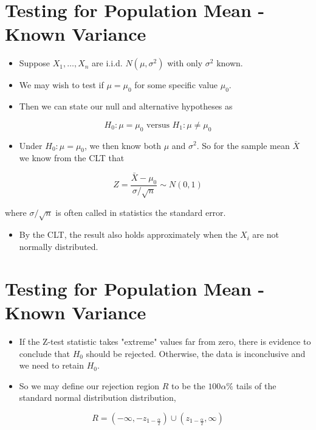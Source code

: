 \documentclass[10pt]{article}
\begin{document}
\section*{Testing for Population Mean - Known Variance}
\begin{itemize}
  \item Suppose $X_{1}, \ldots, X_{n}$ are i.i.d. $N\left(\mu, \sigma^{2}\right)$ with only $\sigma^{2}$ known.
  \item We may wish to test if $\mu=\mu_{0}$ for some specific value $\mu_{0}$.
  \item Then we can state our null and alternative hypotheses as
\end{itemize}

$$
H_{0}: \mu=\mu_{0} \text { versus } H_{1}: \mu \neq \mu_{0}
$$

\begin{itemize}
  \item Under $H_{0}: \mu=\mu_{0}$, we then know both $\mu$ and $\sigma^{2}$. So for the sample mean $\bar{X}$ we know from the CLT that
\end{itemize}

$$
Z=\frac{\bar{X}-\mu_{0}}{\sigma / \sqrt{n}} \sim N(0,1)
$$

where $\sigma / \sqrt{n}$ is often called in statistics the standard error.

\begin{itemize}
  \item By the CLT, the result also holds approximately when the $X_{i}$ are not normally distributed.
\end{itemize}

\section*{Testing for Population Mean - Known Variance}
\begin{itemize}
  \item If the Z-test statistic takes "extreme" values far from zero, there is evidence to conclude that $H_{0}$ should be rejected. Otherwise, the data is inconclusive and we need to retain $H_{0}$.
  \item So we may define our rejection region $R$ to be the $100 \alpha \%$ tails of the standard normal distribution distribution,
\end{itemize}

$$
R=\left(-\infty,-z_{1-\frac{\alpha}{2}}\right) \cup\left(z_{1-\frac{\alpha}{2}}, \infty\right)
$$
\end{document}
